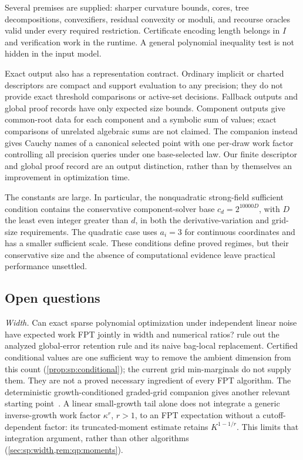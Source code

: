 Several premises are supplied: sharper curvature bounds, cores, tree
decompositions, convexifiers, residual convexity or moduli, and recourse
oracles valid under every required restriction. Certificate encoding length
belongs in $I$ and verification work in the runtime. A general polynomial
inequality test is not hidden in the input model.

Exact output also has a representation contract. Ordinary implicit or
charted descriptors are compact and support evaluation to any precision;
they do not provide exact threshold comparisons or active-set decisions.
Fallback outputs and global proof records have only expected size bounds.
Component outputs give common-root data for each component and a symbolic
sum of values; exact comparisons of unrelated algebraic sums are not
claimed. The companion instead gives Cauchy names of a canonical selected
point with one per-draw work factor controlling all precision queries under
one base-selected law. Our finite descriptor and global proof record are
an output distinction, rather than by themselves an improvement in
optimization time.

The constants are large. In particular, the nonquadratic strong-field
sufficient condition contains the conservative component-solver base
$c_d=2^{10000D}$, with $D$ the least even integer greater than $d$, in both
the derivative-variation and grid-size requirements. The quadratic case
uses $a_i=3$ for continuous coordinates and has a smaller sufficient scale.
These conditions define proved regimes, but their conservative size and the
absence of computational evidence leave practical performance unsettled.

\subsection{Open questions}\label{sec:disc:open}

\emph{Width.} Can exact sparse polynomial optimization under independent
linear noise have expected work FPT jointly in width and numerical ratios?
 rule out the analyzed global-error
retention rule and its naive bag-local replacement. Certified conditional
values are one sufficient way to remove the ambient dimension from this
count (\cref{prop:sp:conditional}); the current grid min-marginals do not
supply them. They are not a proved necessary ingredient of every FPT
algorithm. The deterministic growth-conditioned graded-grid companion gives
another relevant starting point~\citep{companion-decomposition-aware}.
A linear small-growth tail alone does not integrate a generic
inverse-growth work factor $\kappa^r$, $r>1$, to an FPT expectation without
a cutoff-dependent factor: its truncated-moment estimate retains
$K^{1-1/r}$. This limits that integration argument, rather than other
algorithms (\cref{sec:sp:width,rem:qp:moments}).

